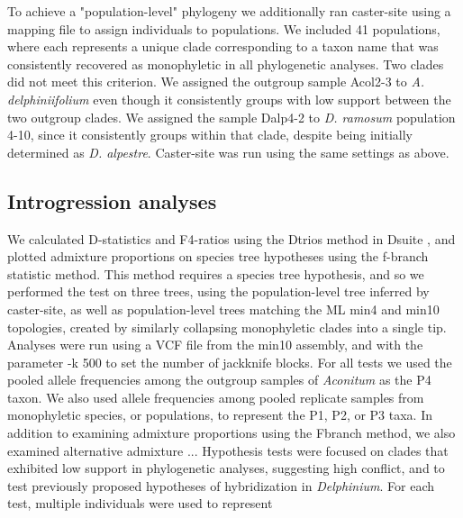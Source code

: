 \documentclass[11pt]{article}
\begin{document}
To achieve a "population-level" phylogeny we additionally ran caster-site using 
a mapping file to assign individuals to populations. We included 41 
populations, where each represents a unique clade corresponding to a taxon name
that was consistently recovered as monophyletic in all phylogenetic analyses. 
Two clades did not meet this criterion.
We assigned the outgroup sample Acol2-3 to \emph{A. delphiniifolium} even though
it consistently groups with low support between the two outgroup clades. 
We assigned the sample Dalp4-2 to \emph{D. ramosum} population 4-10, 
since it consistently groups within that clade, despite being initially 
determined as \emph{D. alpestre}.
Caster-site was run using the same settings as above. 


\subsection{Introgression analyses}
We calculated D-statistics \citep{durand_testing_2011} and F4-ratios using the
Dtrios method in Dsuite \citep{malinsky_dsuite_2021}, and plotted admixture 
proportions on species tree hypotheses using the f-branch statistic method.
This method requires a species tree hypothesis, and so we performed the test 
on three trees, using the population-level tree inferred by caster-site, 
as well as population-level trees matching the ML min4 and min10 topologies, 
created by similarly collapsing monophyletic clades into a single tip.
Analyses were run using a VCF file from the min10 assembly, and with the 
parameter -k 500 to set the number of jackknife blocks.
% 
For all tests we used the pooled allele frequencies among the outgroup samples 
of \emph{Aconitum} as the P4 taxon. We also used allele frequencies among pooled
replicate samples from monophyletic species, or populations, to represent the
P1, P2, or P3 taxa. 
% 
In addition to examining admixture proportions using the Fbranch method, we also
examined alternative admixture ...
Hypothesis tests were focused on clades that exhibited low 
support in phylogenetic analyses, suggesting high conflict, and to test previously 
proposed hypotheses of hybridization in \emph{Delphinium}. 
For each test, multiple individuals were used to represent 
\end{document}
